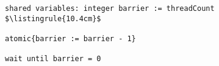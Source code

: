 \begin{minipage}
\centering
\begin{lstlisting}[mathescape, linewidth=10.4cm]
shared variables: integer barrier := threadCount
$\listingrule{10.4cm}$

atomic{barrier := barrier - 1}

wait until barrier = 0
\end{lstlisting}
\end{minipage}
